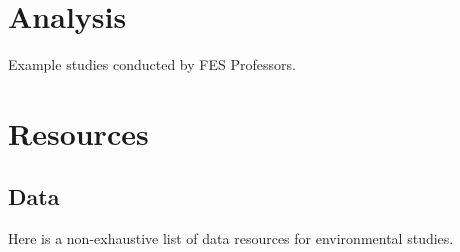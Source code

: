 \documentclass[
]{book}
\begin{document}
\hypertarget{analysis}{%
\chapter{Analysis}\label{analysis}}

Example studies conducted by FES Professors.

\hypertarget{resources}{%
\chapter{Resources}\label{resources}}

\hypertarget{data}{%
\section{Data}\label{data}}

Here is a non-exhaustive list of data resources for environmental studies.
\end{document}
